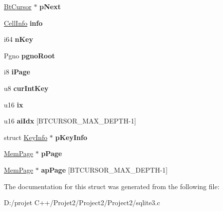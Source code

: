 \begin{DoxyCompactItemize}
\mbox{\hyperlink{struct_bt_cursor}{Bt\+Cursor}} $\ast$ {\bfseries p\+Next}
\item 
\mbox{\label{struct_bt_cursor_a9934b348c6e9f4808d8f98ea78788fbe}} 
\mbox{\hyperlink{struct_cell_info}{Cell\+Info}} {\bfseries info}
\item 
\mbox{\label{struct_bt_cursor_a23f6a271258c109aaeda0ba19e808f92}} 
i64 {\bfseries n\+Key}
\item 
\mbox{\label{struct_bt_cursor_a0b038f63a5b1b9df0b892e0773ffdd29}} 
Pgno {\bfseries pgno\+Root}
\item 
\mbox{\label{struct_bt_cursor_adfe516b0ae2c030f5963fda944bf6d8e}} 
i8 {\bfseries i\+Page}
\item 
\mbox{\label{struct_bt_cursor_a37db7ea50e0f355ea6a3d8d3213722c3}} 
u8 {\bfseries cur\+Int\+Key}
\item 
\mbox{\label{struct_bt_cursor_a98bcbd9801b61e38b4a1a4442ad32ec5}} 
u16 {\bfseries ix}
\item 
\mbox{\label{struct_bt_cursor_a61992c656430b08c77c002302aa3d8d1}} 
u16 {\bfseries ai\+Idx} \mbox{[}B\+T\+C\+U\+R\+S\+O\+R\+\_\+\+M\+A\+X\+\_\+\+D\+E\+P\+TH-\/1\mbox{]}
\item 
\mbox{\label{struct_bt_cursor_ad2360bda13f959ed70672eb421fdb5ec}} 
struct \mbox{\hyperlink{struct_key_info}{Key\+Info}} $\ast$ {\bfseries p\+Key\+Info}
\item 
\mbox{\label{struct_bt_cursor_ac2330fc36a0a3142bbab95dad4874a03}} 
\mbox{\hyperlink{struct_mem_page}{Mem\+Page}} $\ast$ {\bfseries p\+Page}
\item 
\mbox{\label{struct_bt_cursor_ac4e6357050287ac58088aab7ec5f0719}} 
\mbox{\hyperlink{struct_mem_page}{Mem\+Page}} $\ast$ {\bfseries ap\+Page} \mbox{[}B\+T\+C\+U\+R\+S\+O\+R\+\_\+\+M\+A\+X\+\_\+\+D\+E\+P\+TH-\/1\mbox{]}
\end{DoxyCompactItemize}


The documentation for this struct was generated from the following file\+:\begin{DoxyCompactItemize}
\item 
D\+:/projet C++/\+Projet2/\+Project2/\+Project2/sqlite3.\+c\end{DoxyCompactItemize}
